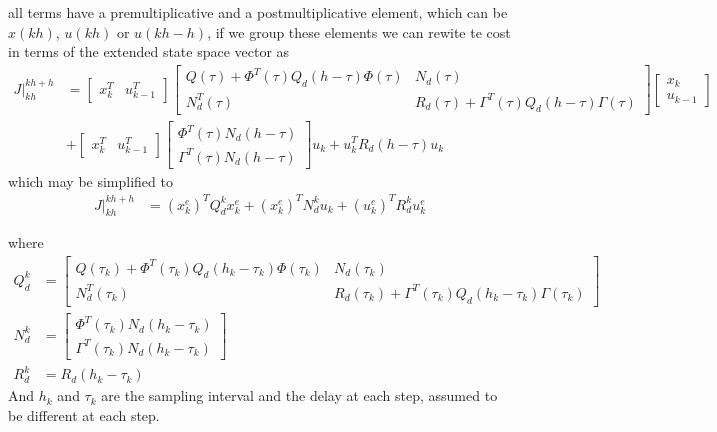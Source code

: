 \documentclass[nols]{tufte-handout}
\theoremstyle{definition}
\begin{document}
all terms have a premultiplicative and a postmultiplicative element, which can be $x(kh)$, $u(kh)$ or $u(kh-h)$, if we group these elements we can rewite te cost in terms of the extended state space vector as
\begin{align}
     \nonumber    J|_{kh}^{kh+h}&=
     \begin{bmatrix}
        x_{k}^T &
        u_{k-1}^T
    \end{bmatrix}
    \begin{bmatrix}
        Q(\tau)+\Phi^T\!(\tau)Q_d(h-\tau)\Phi(\tau) & N_d(\tau)\\
        N_d^T\!(\tau) & R_d(\tau)+\Gamma^T\!(\tau)Q_d(h-\tau)\Gamma(\tau)
    \end{bmatrix}
    \begin{bmatrix}
        x_{k}\\
        u_{k-1}
    \end{bmatrix}\\
    \nonumber &+ \begin{bmatrix}
        x_{k}^T &
        u_{k-1}^T
    \end{bmatrix}
    \begin{bmatrix}
        \Phi^T\!(\tau)N_d(h-\tau)\\
        \Gamma^T\!(\tau)N_d(h-\tau)
    \end{bmatrix}u_k+
    u^T_kR_d(h-\tau)u_k
\end{align}
which may be simplified to 
\begin{align}
    \nonumber    J|_{kh}^{kh+h}&=(x_k^e)^TQ_d^kx_k^e+(x_k^e)^TN_d^ku_k+(u_k^e)^TR_d^ku_k^e
\end{align}

where 
\begin{align}
    Q_d^k & =  \begin{bmatrix}
        Q(\tau_k)+\Phi^T\!(\tau_k)Q_d(h_k-\tau_k)\Phi(\tau_k) & N_d(\tau_k)\\
        N_d^T\!(\tau_k) & R_d(\tau_k)+\Gamma^T\!(\tau_k)Q_d(h_k-\tau_k)\Gamma(\tau_k)
    \end{bmatrix}\\
    N_d^k & =\begin{bmatrix}
        \Phi^T\!(\tau_k)N_d(h_k-\tau_k)\\
        \Gamma^T\!(\tau_k)N_d(h_k-\tau_k)
    \end{bmatrix}\\
    R_d^k & =R_d(h_k-\tau_k)
\end{align}
And $h_k$ and $\tau_k$ are the sampling interval and the delay at each step, assumed to be different at each step.
\end{document}
